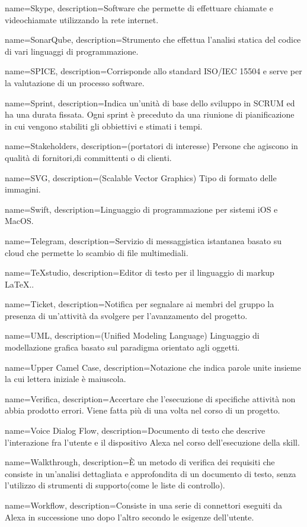 {
name={Skype},
description={Software che permette di effettuare chiamate e videochiamate utilizzando la rete internet.}
}

{
name={SonarQube},
description={Strumento che effettua l’analisi statica del codice di vari linguaggi di programmazione.}
}

{
name={SPICE},
description={Corrisponde allo standard ISO/IEC 15504 e serve per la valutazione di un processo software.}
}

{
name={Sprint},
description={Indica un’unità di base dello sviluppo in SCRUM ed ha una durata fissata. Ogni sprint è preceduto da una riunione di pianificazione in cui vengono stabiliti gli obbiettivi e stimati i tempi.}
}

{
name={Stakeholders},
description={(portatori di interesse) Persone che agiscono in qualità di fornitori,di committenti o di clienti.}
}

{
name={SVG},
description={(Scalable Vector Graphics) Tipo di formato delle immagini.}
}

{
name={Swift},
description={Linguaggio di programmazione per sistemi iOS e MacOS.}
}

{
name={Telegram},
description={Servizio di messaggistica istantanea basato su cloud che permette lo scambio di file multimediali.}
}

{
name={TeXstudio},
description={Editor di testo per il linguaggio di markup \LaTeX..}
}

{
name={Ticket},
description={Notifica per segnalare ai membri del gruppo la presenza di un’attività da svolgere per l’avanzamento del progetto.}
}

{
name={UML},
description={(Unified Modeling Language) Linguaggio di modellazione grafica basato sul paradigma orientato agli oggetti.}
}

{
name={Upper Camel Case},
description={Notazione che indica parole unite insieme la cui lettera iniziale è maiuscola.}
}

{
name={Verifica},
description={Accertare che l’esecuzione di specifiche attività non abbia prodotto errori. Viene fatta più di una volta nel corso di un progetto.}
}

{
name={Voice Dialog Flow},
description={Documento di testo che descrive l'interazione fra l'utente e il dispositivo Alexa nel corso dell'esecuzione della skill.}
}

{
name={Walkthrough},
description={È un metodo di verifica dei requisiti che consiste in un'analisi dettagliata e approfondita di un documento di testo, senza l'utilizzo di strumenti di supporto(come le liste di controllo).}
}

{
name={Workflow},
description={Consiste in una serie di connettori eseguiti da Alexa in successione uno dopo l'altro secondo le esigenze dell'utente. }
}